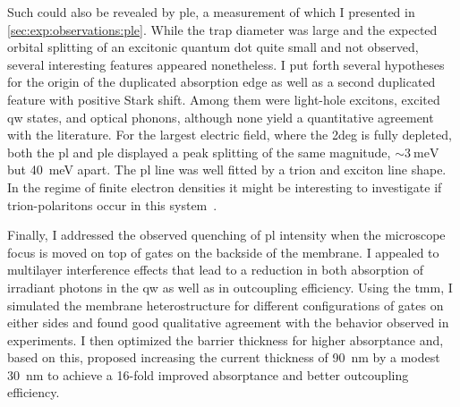 Such could also be revealed by \acrfull{ple}, a measurement of which I presented in \cref{sec:exp:observations:ple}.
While the trap diameter was large and the expected orbital splitting of an excitonic quantum dot quite small and not observed, several interesting features appeared nonetheless.
I put forth several hypotheses for the origin of the duplicated absorption edge as well as a second duplicated feature with positive Stark shift.
Among them were light-hole excitons, excited \gls{qw} states, and optical phonons, although none yield a quantitative agreement with the literature.
For the largest electric field, where the \gls{2deg} is fully depleted, both the \gls{pl} and \gls{ple} displayed a peak splitting of the same magnitude, $\sim\qty{3}{\milli\electronvolt}$ but \qty{40}{\milli\electronvolt} apart.
The \gls{pl} line was well fitted by a trion and exciton line shape.
In the regime of finite electron densities it might be interesting to investigate if trion-polaritons occur in this system~\cite{Baeten2015,Glazov2020,Huang2023b}.

Finally, I addressed the observed quenching of \gls{pl} intensity when the microscope focus is moved on top of gates on the backside of the membrane.
I appealed to multilayer interference effects that lead to a reduction in both absorption of irradiant photons in the \gls{qw} as well as in outcoupling efficiency.
Using the \acrfull{tmm}, I simulated the membrane heterostructure for different configurations of gates on either sides and found good qualitative agreement with the behavior observed in experiments.
I then optimized the  barrier thickness for higher absorptance and, based on this, proposed increasing the current thickness of \qty{90}{\nano\meter} by a modest \qty{30}{\nano\meter} to achieve a \num{16}-fold improved absorptance and better outcoupling efficiency.

